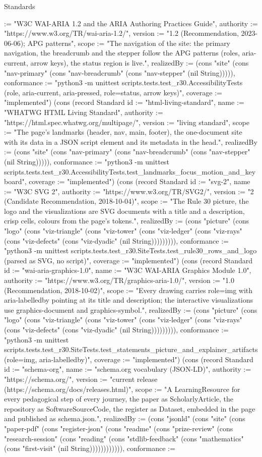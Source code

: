 \begin{lexlean}{Standards}
\begin{semanticmodule}
{:= "W3C WAI-ARIA 1.2 and the ARIA Authoring Practices Guide", authority := "https://www.w3.org/TR/wai-aria-1.2/", version := "1.2 (Recommendation, 2023-06-06); APG patterns", scope := "The navigation of the site: the primary navigation, the breadcrumb and the stepper follow the APG patterns (roles, aria-current, arrow keys), the status region is live.", realizedBy := (cons "site" (cons "nav-primary" (cons "nav-breadcrumb" (cons "nav-stepper" (nil String))))), conformance := "python3 -m unittest scripts.tests.test_r30.AccessibilityTests (role, aria-current, aria-pressed, role=status, arrow keys)", coverage := "implemented"}) (cons (record Standard {id := "html-living-standard", name := "WHATWG HTML Living Standard", authority := "https://html.spec.whatwg.org/multipage/", version := "living standard", scope := "The page's landmarks (header, nav, main, footer), the one-document site with its data in a JSON script element and its metadata in the head.", realizedBy := (cons "site" (cons "nav-primary" (cons "nav-breadcrumb" (cons "nav-stepper" (nil String))))), conformance := "python3 -m unittest scripts.tests.test_r30.AccessibilityTests.test_landmarks_focus_motion_and_keyboard", coverage := "implemented"}) (cons (record Standard {id := "svg-2", name := "W3C SVG 2", authority := "https://www.w3.org/TR/SVG2/", version := "2 (Candidate Recommendation, 2018-10-04)", scope := "The Rule 30 picture, the logo and the visualizations are SVG documents with a title and a description, crisp cells, colours from the page's tokens.", realizedBy := (cons "picture" (cons "logo" (cons "viz-triangle" (cons "viz-tower" (cons "viz-ledger" (cons "viz-rays" (cons "viz-defects" (cons "viz-dyadic" (nil String))))))))), conformance := "python3 -m unittest scripts.tests.test_r30.SiteTests.test_rule30_rows_and_logo (parsed as SVG, no script)", coverage := "implemented"}) (cons (record Standard {id := "wai-aria-graphics-1.0", name := "W3C WAI-ARIA Graphics Module 1.0", authority := "https://www.w3.org/TR/graphics-aria-1.0/", version := "1.0 (Recommendation, 2018-10-02)", scope := "Every drawing carries role=img with aria-labelledby pointing at its title and description; the interactive visualizations use graphics-document and graphics-symbol.", realizedBy := (cons "picture" (cons "logo" (cons "viz-triangle" (cons "viz-tower" (cons "viz-ledger" (cons "viz-rays" (cons "viz-defects" (cons "viz-dyadic" (nil String))))))))), conformance := "python3 -m unittest scripts.tests.test_r30.SiteTests.test_statements_picture_and_explainer_artifacts (role=img, aria-labelledby)", coverage := "implemented"}) (cons (record Standard {id := "schema-org", name := "schema.org vocabulary (JSON-LD)", authority := "https://schema.org/", version := "current release (https://schema.org/docs/releases.html)", scope := "A LearningResource for every pedagogical step of every journey, the paper as ScholarlyArticle, the repository as SoftwareSourceCode, the register as Dataset, embedded in the page and published as schema.json.", realizedBy := (cons "jsonld" (cons "site" (cons "paper-pdf" (cons "register-json" (cons "readme" (cons "prize-review" (cons "research-session" (cons "reading" (cons "stdlib-feedback" (cons "mathematics" (cons "first-visit" (nil String)))))))))))), conformance := }
\end{semanticmodule}
\end{lexlean}
